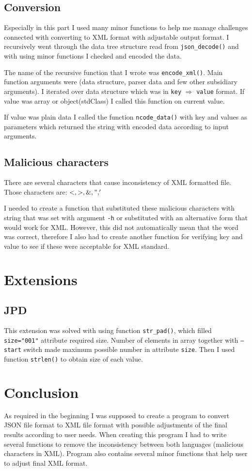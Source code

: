 \documentclass[a4paper, 10pt]{article}
\begin{document}
\subsection{Conversion}
Especially in this part I used many minor functions to help me manage challenges connected with converting to XML format with adjustable output format. I recursively went through the data tree structure read from {\tt json\_decode()} and with using minor functions I checked and encoded the data. 


The name of the recursive function that I wrote was {\tt encode\_xml()}. Main function arguments were (data structure, parser data and few other subsidiary arguments). I iterated over data structure which was in {\tt key} $\Rightarrow$ {\tt value} format. If value was array or object(stdClass) I called this function on current value. 

If value was plain data I called the function {\tt ncode\_data()} with key and values as parameters which returned the string with encoded data according to input arguments. 

\subsection{Malicious characters}
There are several characters that cause inconsistency of XML formatted file. Those characters are: $< , >, \&, ",'$ 

I needed to create a function that substituted these malicious characters with string that was set with argument {\tt -h} or substituted with an alternative form that would work for XML. However, this did not automatically mean that the word was correct, therefore I also had to create another function for verifying key and value to see if these were acceptable for XML standard.
\section{Extensions}

\subsection{JPD}

This extension was solved with using function {\tt str\_pad()}, which filled {\tt size=\verb!"001"!} attribute required size. Number of elements in array together with {\tt --start} switch made maximum possible number in attribute {\tt size}. Then I used function {\tt strlen()} to obtain size of each value.


\section{Conclusion}

As required in the beginning I was supposed to create a program to convert JSON file format to XML file format with possible adjustments of the final results according to user needs. When creating this program I had to write several functions to remove the inconsistency between both languages (malicious characters in XML). Program also contains several minor functions that help user to adjust final XML format.
\end{document}
